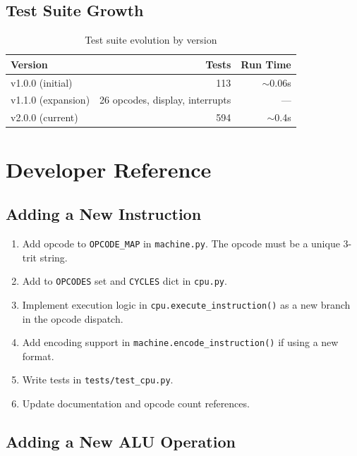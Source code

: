 \documentclass[10pt,a4paper,twoside]{book}
\begin{document}
\section{Test Suite Growth}

\begin{table}[H]
\centering
\caption{Test suite evolution by version}
\label{app:testgrowth}
\begin{tabular}{lrr}
\toprule
Version & Tests & Run Time \\
\midrule
v1.0.0 (initial) & 113 & $\sim$0.06s \\
v1.1.0 (expansion) & 26 opcodes, display, interrupts & --- \\
v2.0.0 (current) & 594 & $\sim$0.4s \\
\bottomrule
\end{tabular}
\end{table}

\chapter{Developer Reference}
\label{app:devguide}

\section{Adding a New Instruction}

\begin{enumerate}
    \item Add opcode to \texttt{OPCODE\_MAP} in \texttt{machine.py}. The opcode must
          be a unique 3-trit string.
    \item Add to \texttt{OPCODES} set and \texttt{CYCLES} dict in \texttt{cpu.py}.
    \item Implement execution logic in \texttt{cpu.execute\_instruction()} as a new
          branch in the opcode dispatch.
    \item Add encoding support in \texttt{machine.encode\_instruction()} if using a new
          format.
    \item Write tests in \texttt{tests/test\_cpu.py}.
    \item Update documentation and opcode count references.
\end{enumerate}

\section{Adding a New ALU Operation}
\end{document}
